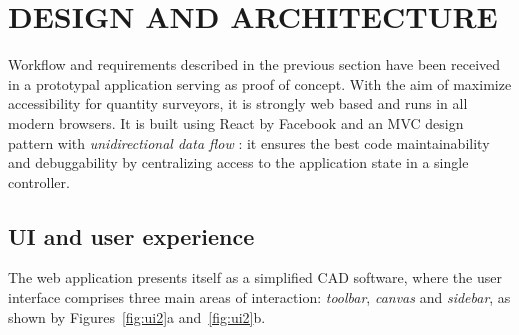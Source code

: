 \section{\uppercase{Design and Architecture}}
\label{sec:architecture}


\noindent
Workflow and requirements described in the previous section have been received in a prototypal application serving as proof of concept. With the aim of maximize accessibility for quantity surveyors, it is strongly web based and runs in all modern browsers. It is built using React by Facebook and an MVC design pattern with \emph{unidirectional data flow} \cite{redux}:  it ensures the best code maintainability and debuggability by centralizing access to the application state in a single controller.

\subsection{UI and user experience}

\noindent
The web application presents itself as a simplified CAD software, where the user interface comprises three main areas of interaction: \emph{toolbar}, \emph{canvas} and \emph{sidebar}, as shown by Figures~\ref{fig:ui2}a and~\ref{fig:ui2}b.

